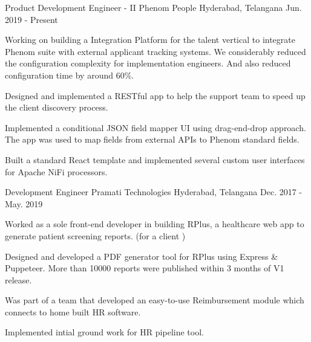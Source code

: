 

\begin{cventries}

  \cventry
  {Product Development Engineer - II} %
  {Phenom People} %
  {Hyderabad, Telangana} %
  {Jun. 2019 - Present} %
  {
    \begin{cvitems} %
      \item {Working on building a Integration Platform for the talent vertical to integrate Phenom suite with external applicant tracking systems. We considerably reduced the configuration complexity for implementation engineers. And also reduced configuration time by around 60\%.}
      \item {Designed and implemented a RESTful app to help the support team to speed up the client discovery process.}
      \item {Implemented a conditional JSON field mapper UI using drag-end-drop approach. The app was used to map fields from external APIs to Phenom standard fields.}
      \item {Built a standard React template and implemented several custom user interfaces for Apache NiFi processors.}
    \end{cvitems}
  }

  \cventry
  {Development Engineer} %
  {Pramati Technologies} %
  {Hyderabad, Telangana} %
  {Dec. 2017 - May. 2019} %
  {
    \begin{cvitems} %
      \item {Worked as a sole front-end developer in building RPlus, a healthcare web app to generate patient screening reports. (for a client )}
      \item {Designed and developed a PDF generator tool for RPlus using Express \& Puppeteer. More than 10000 reports were published within 3 months of V1 release.}
      \item {Was part of a team that developed an easy-to-use Reimbursement module which connects to home built HR software.}
      \item {Implemented intial ground work for HR pipeline tool.}
    \end{cvitems}
  }


\end{cventries}
